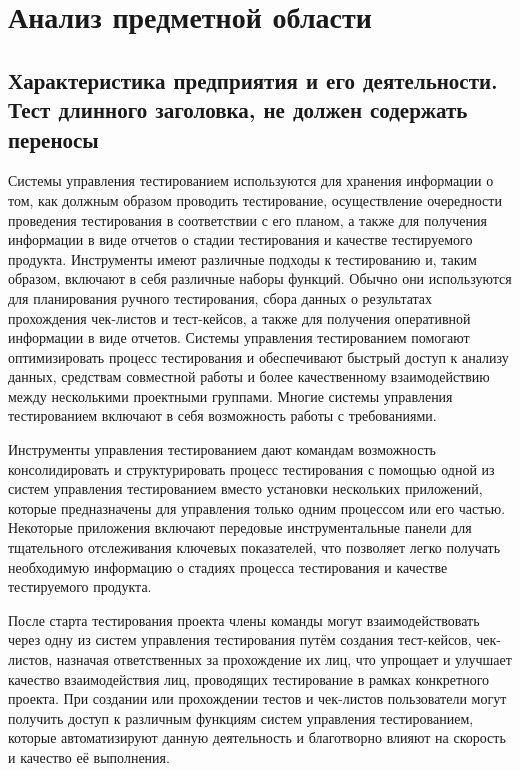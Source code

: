 \section{Анализ предметной области}
\subsection{Характеристика предприятия и его деятельности. Тест длинного заголовка, не должен содержать переносы}

Системы управления тестированием используются для хранения информации о том, как должным образом проводить тестирование, осуществление очередности проведения тестирования в соответствии с его планом, а также для получения информации в виде отчетов о стадии тестирования и качестве тестируемого продукта. Инструменты имеют различные подходы к тестированию и, таким образом, включают в себя различные наборы функций. Обычно они используются для планирования ручного тестирования, сбора данных о результатах прохождения чек-листов и тест-кейсов, а также для получения оперативной информации в виде отчетов. Системы управления тестированием помогают оптимизировать процесс тестирования и обеспечивают быстрый доступ к анализу данных, средствам совместной работы и более качественному взаимодействию между несколькими проектными группами. Многие системы управления тестированием включают в себя возможность работы с требованиями.

Инструменты управления тестированием дают командам возможность консолидировать и структурировать процесс тестирования с помощью одной из систем управления тестированием вместо установки нескольких приложений, которые предназначены для управления только одним процессом или его частью. Некоторые приложения включают передовые инструментальные панели для тщательного отслеживания ключевых показателей, что позволяет легко получать необходимую информацию о стадиях процесса тестирования и качестве тестируемого продукта.

После старта тестирования проекта члены команды могут взаимодействовать через одну из систем управления тестирования путём создания тест-кейсов, чек-листов, назначая ответственных за прохождение их лиц, что упрощает и улучшает качество взаимодействия лиц, проводящих тестирование в рамках конкретного проекта. При создании или прохождении тестов и чек-листов пользователи могут получить доступ к различным функциям систем управления тестированием, которые автоматизируют данную деятельность и благотворно влияют на скорость и качество её выполнения.

